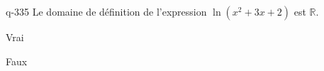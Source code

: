 \begin{truefalse}{q-335}
Le domaine de définition de l'expression $\ln(x^2+3x+2)$ est $\mathbb{R}$.
\item Vrai
\item* Faux
\end{truefalse}

